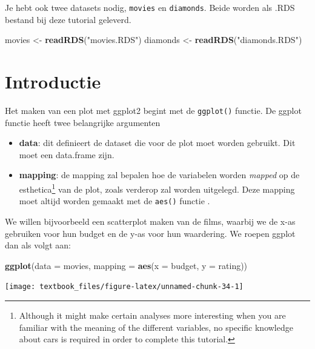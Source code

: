\documentclass[]{tufte-book}
\newenvironment{Shaded}{}{}
\newcommand{\DataTypeTok}[1]{\textcolor[rgb]{0.56,0.13,0.00}{#1}}
\newcommand{\KeywordTok}[1]{\textcolor[rgb]{0.00,0.44,0.13}{\textbf{#1}}}
\newcommand{\NormalTok}[1]{#1}
\newcommand{\StringTok}[1]{\textcolor[rgb]{0.25,0.44,0.63}{#1}}
\providecommand{\tightlist}{%
  \setlength{\itemsep}{0pt}\setlength{\parskip}{0pt}}
\begin{document}
Je hebt ook twee datasets nodig, \texttt{movies} en \texttt{diamonds}. Beide worden als .RDS bestand bij deze tutorial geleverd.

\begin{Shaded}
\begin{Highlighting}[]
\NormalTok{movies <-}\StringTok{ }\KeywordTok{readRDS}\NormalTok{(}\StringTok{"movies.RDS"}\NormalTok{)}
\NormalTok{diamonds <-}\StringTok{ }\KeywordTok{readRDS}\NormalTok{(}\StringTok{"diamonds.RDS"}\NormalTok{)}
\end{Highlighting}
\end{Shaded}

\hypertarget{introductie}{%
\section{Introductie}\label{introductie}}

Het maken van een plot met ggplot2 begint met de \texttt{ggplot()} functie. De ggplot functie heeft twee belangrijke argumenten

\begin{itemize}
\tightlist
\item
  \textbf{data}: dit definieert de dataset die voor de plot moet worden gebruikt. Dit moet een data.frame zijn.
\item
  \textbf{mapping}: de mapping zal bepalen hoe de variabelen worden \emph{mapped} op de esthetica\footnote{Although it might make certain analyses more interesting when you are familiar with the meaning of the different variables, no specific knowledge about cars is required in order to complete this tutorial.} van de plot, zoals verderop zal worden uitgelegd. Deze mapping moet altijd worden gemaakt met de \texttt{aes()} functie .
\end{itemize}

We willen bijvoorbeeld een scatterplot maken van de films, waarbij we de x-as gebruiken voor hun budget en de y-as voor hun waardering. We roepen ggplot dan als volgt aan:

\begin{Shaded}
\begin{Highlighting}[]
\KeywordTok{ggplot}\NormalTok{(}\DataTypeTok{data =}\NormalTok{ movies, }\DataTypeTok{mapping =} \KeywordTok{aes}\NormalTok{(}\DataTypeTok{x =}\NormalTok{ budget, }\DataTypeTok{y =}\NormalTok{ rating))}
\end{Highlighting}
\end{Shaded}

\texttt{[image: textbook\_files/figure-latex/unnamed-chunk-34-1]}
\end{document}
